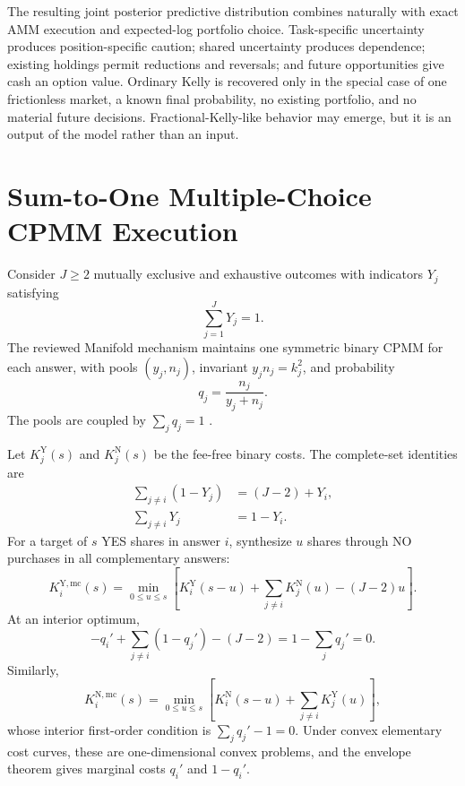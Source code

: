 \documentclass[journal,a4paper]{IEEEtran}
\begin{document}
The resulting joint posterior predictive distribution combines naturally with exact AMM execution and expected-log portfolio choice. Task-specific uncertainty produces position-specific caution; shared uncertainty produces dependence; existing holdings permit reductions and reversals; and future opportunities give cash an option value. Ordinary Kelly is recovered only in the special case of one frictionless market, a known final probability, no existing portfolio, and no material future decisions. Fractional-Kelly-like behavior may emerge, but it is an output of the model rather than an input.

\appendices
\section{Sum-to-One Multiple-Choice CPMM Execution}
Consider $J\geq2$ mutually exclusive and exhaustive outcomes with indicators $Y_j$ satisfying
\begin{equation}
\sum_{j=1}^{J}Y_j=1.
\end{equation}
The reviewed Manifold mechanism maintains one symmetric binary CPMM for each answer, with pools $(y_j,n_j)$, invariant $y_jn_j=k_j^2$, and probability
\begin{equation}
q_j=\frac{n_j}{y_j+n_j}.
\end{equation}
The pools are coupled by $\sum_j q_j=1$ \cite{manifold-arbitrage}.

Let $K_j^{\mathrm{Y}}(s)$ and $K_j^{\mathrm{N}}(s)$ be the fee-free binary costs. The complete-set identities are
\begin{align}
\sum_{j\neq i}(1-Y_j)&=(J-2)+Y_i,\\
\sum_{j\neq i}Y_j&=1-Y_i.
\end{align}
For a target of $s$ YES shares in answer $i$, synthesize $u$ shares through NO purchases in all complementary answers:
\begin{equation}
K_i^{\mathrm{Y,mc}}(s)
=
\min_{0\leq u\leq s}
\left[
K_i^{\mathrm{Y}}(s-u)
+
\sum_{j\neq i}K_j^{\mathrm{N}}(u)
-(J-2)u
\right].
\label{eq:mc-yes}
\end{equation}
At an interior optimum,
\begin{equation}
-q_i'+\sum_{j\neq i}(1-q_j')-(J-2)
=
1-\sum_jq_j'=0.
\end{equation}
Similarly,
\begin{equation}
K_i^{\mathrm{N,mc}}(s)
=
\min_{0\leq u\leq s}
\left[
K_i^{\mathrm{N}}(s-u)
+
\sum_{j\neq i}K_j^{\mathrm{Y}}(u)
\right],
\label{eq:mc-no}
\end{equation}
whose interior first-order condition is $\sum_jq_j'-1=0$. Under convex elementary cost curves, these are one-dimensional convex problems, and the envelope theorem gives marginal costs $q_i'$ and $1-q_i'$.
\end{document}
